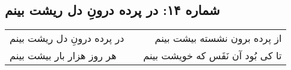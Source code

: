 \begin{center}
\section*{شماره ۱۴: در پرده درونِ دل ریشت بینم}
\label{sec:014}
\begin{longtable}{l p{0.5cm} r}
در پرده درونِ دل ریشت بینم
&&
از پرده برون نشسته بیشت بینم
\\
هر روز هزار بار بیشت بینم
&&
تا کی بُود آن نَفَس که خویشت بینم
\\
\end{longtable}
\end{center}
